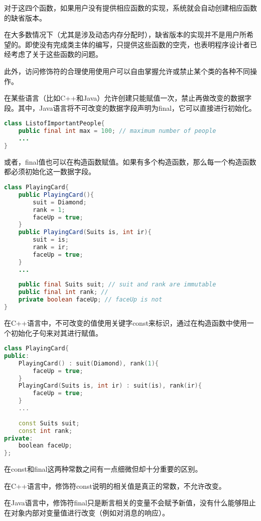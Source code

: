对于这四个函数，如果用户没有提供相应函数的实现，系统就会自动创建相应函数的缺省版本。

在大多数情况下（尤其是涉及动态内存分配时），缺省版本的实现并不是用户所希望的。即使没有完成类主体的编写，只提供这些函数的空壳，也表明程序设计者已经考虑了关于这些函数的问题。

此外，访问修饰符的合理使用使用户可以自由掌握允许或禁止某个类的各种不同操作。

在某些语言（比如C++和Java）允许创建只能赋值一次，禁止再做改变的数据字段。其中，Java语言将不可改变的数据字段声明为final，它可以直接进行初始化。




\begin{lstlisting}[language=Java]
class ListofImportantPeople{
	public final int max = 100; // maximum number of people
	...
}
\end{lstlisting}

或者，final值也可以在构造函数赋值。如果有多个构造函数，那么每一个构造函数都必须初始化这一数据字段。



\begin{lstlisting}[language=Java]
class PlayingCard{
	public PlayingCard(){
		suit = Diamond;
		rank = 1;
		faceUp = true;
	}
	public PlayingCard(Suits is, int ir){
		suit = is;
		rank = ir;
		faceUp = true;
	}
	...
	
	public final Suits suit; // suit and rank are immutable
	public final int rank; // 
	private boolean faceUp; // faceUp is not
}
\end{lstlisting}

在C++语言中，不可改变的值使用关键字const来标识，通过在构造函数中使用一个初始化子句来对其进行赋值。


\begin{lstlisting}[language=C++]
class PlayingCard{
public:
	PlayingCard() : suit(Diamond), rank(1){
		faceUp = true;
	}
	PlayingCard(Suits is, int ir) : suit(is), rank(ir){
		faceUp = true;
	}
	...
	
	const Suits suit;
	const int rank;
private:
	boolean faceUp;
};
\end{lstlisting}

在const和final这两种常数之间有一点细微但却十分重要的区别。

\begin{compactitem}
\item 在C++语言中，修饰符const说明的相关值是真正的常数，不允许改变。
\item 在Java语言中，修饰符final只是断言相关的变量不会赋予新值，没有什么能够阻止在对象内部对变量值进行改变（例如对消息的响应）。
\end{compactitem}

